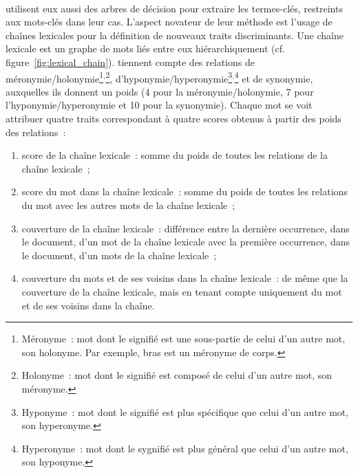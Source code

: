         ~\\ utilisent eux aussi des arbres de
        décision pour extraire les termes-clés, restreints aux mots-clés dans
        leur cas. L'aspect novateur de leur méthode est l'usage de chaînes
        lexicales pour la définition de nouveaux traits discriminants. Une
        chaîne lexicale est un graphe de mots liés entre eux hiérarchiquement
        (cf. figure~\ref{fig:lexical_chain}). 
        tiennent compte des relations de méronymie/holonymie\footnote{Méronyme~:
        mot dont le signifié est une sous-partie de celui d'un autre mot, son
        holonyme. Par exemple, \og{}bras\fg{} est un méronyme de
        \og{}corps\fg{}.}$^,$\footnote{Holonyme~: mot dont le signifié est
        composé de celui d'un autre mot, son méronyme.},
        d'hyponymie/hyperonymie\footnote{Hyponyme~: mot dont le signifié est
        plus spécifique que celui d'un autre mot, son
        hyperonyme.}$^,$\footnote{Hyperonyme~: mot dont le sygnifié est plus
        général que celui d'un autre mot, son hyponyme.} et de synonymie,
        auxquelles ils donnent un poids (4 pour la méronymie/holonymie, 7 pour
        l'hyponymie/hyperonymie et 10 pour la synonymie). Chaque mot se voit
        attribuer quatre traits correspondant à quatre scores obtenus à partir
        des poids des relations~:
        \begin{enumerate}
          \item{score de la chaîne lexicale~: somme du poids de toutes les
                relations de la chaîne lexicale~;}
          \item{score du mot dans la chaîne lexicale~: somme du poids de toutes
                les relations du mot avec les autres mots de la chaîne
                lexicale~;}
          \item{couverture de la chaîne lexicale~: différence entre la dernière
                occurrence, dans le document, d'un mot de la chaîne lexicale
                avec la première occurrence, dans le document, d'un mots de la
                chaîne lexicale~;}
          \item{couverture du mots et de ses voisins dans la chaîne lexicale~:
                de même que la couverture de la chaîne lexicale, mais en tenant
                compte uniquement du mot et de ses voisins dans la chaîne.}
        \end{enumerate}

